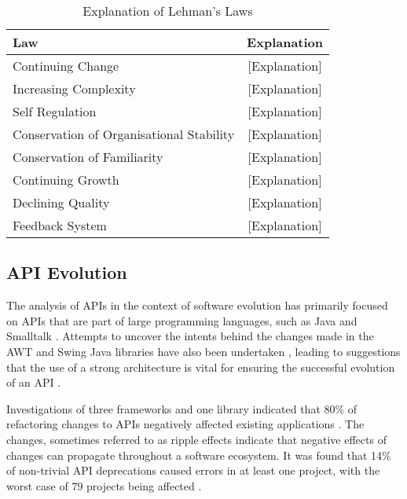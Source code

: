 \documentclass{sig-alternate}
\begin{document}
\begin{table}
       \centering
       \begin{tabular}[ht]{l|c}
              \toprule

              \textbf{Law}                              & \textbf{Explanation}    \\ \midrule
              Continuing Change                         & [Explanation]                      \\ \hline
              Increasing Complexity                     & [Explanation]                     \\ \hline
              Self Regulation                           & [Explanation]                      \\ \hline
              Conservation of Organisational Stability  & [Explanation]                     \\ \hline
              Conservation of Familiarity               & [Explanation]                      \\ \hline
              Continuing Growth                         & [Explanation]                      \\ \hline
              Declining Quality                         & [Explanation]                     \\ \hline
              Feedback System                           & [Explanation]                      \\ 

              \bottomrule

       \end{tabular}
       \caption{Explanation of Lehman's Laws}
       \label{table:expl_laws}
\end{table}


\subsection{API Evolution} \label{related_work}
The analysis of APIs in the context of software evolution has primarily focused on APIs that are part of large programming languages, such as Java \cite{hou2011exploring} \cite{shi2011empirical} and Smalltalk \cite{robbes2012developers}. Attempts to uncover the intents behind the changes made in the AWT and Swing Java libraries have also been undertaken \cite{hou2011exploring}, leading to suggestions that the use of a strong architecture is vital for ensuring the successful evolution of an API \cite{hou2011exploring}.

Investigations of three frameworks and one library indicated that 80\% of refactoring changes to APIs negatively affected existing applications \cite{dig2005role}. The changes, sometimes referred to as ripple effects \cite{robbes2012developers} indicate that negative effects of changes can propagate throughout a software ecosystem. It was found that 14\% of non-trivial API deprecations caused errors in at least one project, with the worst case of 79 projects being affected \cite{robbes2012developers}.
\end{document}
